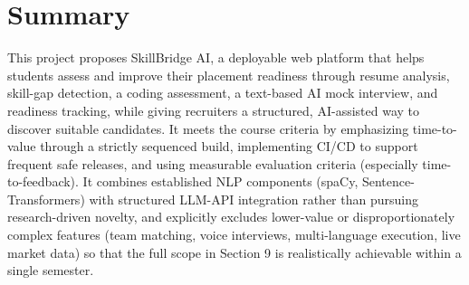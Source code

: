 \documentclass[11pt,a4paper]{article}
\begin{document}
\section{Summary}
This project proposes SkillBridge AI, a deployable web platform that helps students assess and improve their placement readiness through resume analysis, skill-gap detection, a coding assessment, a text-based AI mock interview, and readiness tracking, while giving recruiters a structured, AI-assisted way to discover suitable candidates. It meets the course criteria by emphasizing time-to-value through a strictly sequenced build, implementing CI/CD to support frequent safe releases, and using measurable evaluation criteria (especially time-to-feedback). It combines established NLP components (spaCy, Sentence-Transformers) with structured LLM-API integration rather than pursuing research-driven novelty, and explicitly excludes lower-value or disproportionately complex features (team matching, voice interviews, multi-language execution, live market data) so that the full scope in Section 9 is realistically achievable within a single semester.
\end{document}
